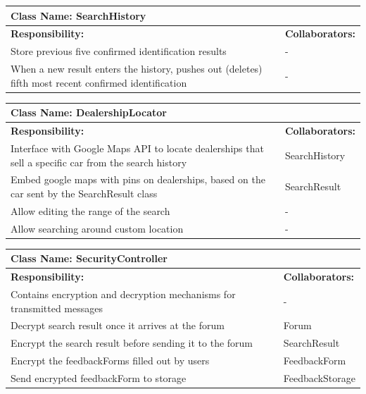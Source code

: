 \documentclass[12pt]{article}
\begin{document}
	\begin{table}[ht]
		\centering
		\begin{tabular}{|p{5cm}|p{5cm}|}
			\hline
			\multicolumn{2}{|l|}{\textbf{Class Name:} SearchHistory} \\
			\hline
			\textbf{Responsibility:} & \textbf{Collaborators:} \\
			\hline
			Store previous five confirmed identification results & -\\
			\hline
			When a new result enters the history, pushes out (deletes) fifth most recent confirmed identification & -\\
			\hline
		\end{tabular}
	\end{table}

	\begin{table}[ht]
		\centering
		\begin{tabular}{|p{5cm}|p{5cm}|}
			\hline
			\multicolumn{2}{|l|}{\textbf{Class Name:} DealershipLocator} \\
			\hline
			\textbf{Responsibility:} & \textbf{Collaborators:} \\
			\hline
			Interface with Google Maps API to locate dealerships that sell a specific car from the search history & SearchHistory\\
			\hline
			Embed google maps with pins on dealerships, based on the car sent by the SearchResult class & SearchResult\\
			\hline
			Allow editing the range of the search & - \\
		    \hline
		    Allow searching around custom location & -\\
		    \hline
		\end{tabular}
	\end{table}

	\begin{table}[ht]
		\centering
		\begin{tabular}{|p{5cm}|p{5cm}|}
			\hline
			\multicolumn{2}{|l|}{\textbf{Class Name:} SecurityController} \\
			\hline
			\textbf{Responsibility:} & \textbf{Collaborators:} \\
			\hline
			Contains encryption and decryption mechanisms for transmitted messages & -\\
			\hline
			Decrypt search result once it arrives at the forum & Forum\\
			\hline
			Encrypt the search result before sending it to the forum & SearchResult\\
			\hline
			Encrypt the feedbackForms filled out by users & FeedbackForm\\
			\hline
			Send encrypted feedbackForm to storage & FeedbackStorage\\
			\hline
		\end{tabular}
	\end{table}
\end{document}
